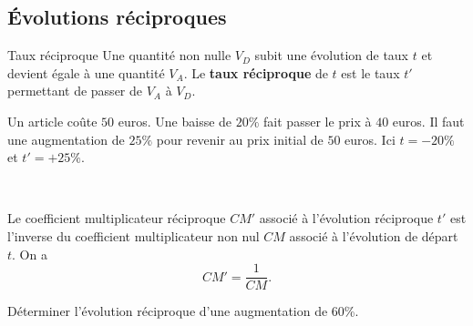 \documentclass[11pt]{article}
\begin{document}
\subsection{Évolutions réciproques}
\begin{defi}{Taux réciproque}
  Une quantité non nulle $V_D$ subit une évolution de taux $t$ et devient égale
  à une quantité $V_A$. Le \textbf{taux réciproque} de $t$ est le taux $t'$
  permettant de passer de $V_A$ à $V_D$.
\end{defi}
\begin{exemple}
  Un article coûte $50$ euros. Une baisse de $20\%$ fait passer le prix à $40$
  euros. Il faut une augmentation de $25\%$ pour revenir au prix initial de $50$
  euros.
  Ici $t=-20\%$ et $t'=+25\%$.

\end{exemple}
\begin{prop}~\\[-5mm]
  \begin{minipage}{0.6\textwidth}
  Le coefficient multiplicateur réciproque $CM'$ associé à l'évolution
  réciproque $t'$ est l'inverse du coefficient multiplicateur non nul $CM$
  associé à l'évolution de départ $t$. On a
  \[
    CM' = \frac{1}{CM}.
  \]
\end{minipage}
  \begin{minipage}{0.4\textwidth}
    \begin{center}
\end{center}

  \end{minipage}

\end{prop}
\begin{app}
  Déterminer l'évolution réciproque d'une augmentation de $60$\%.
\end{app}
\end{document}
